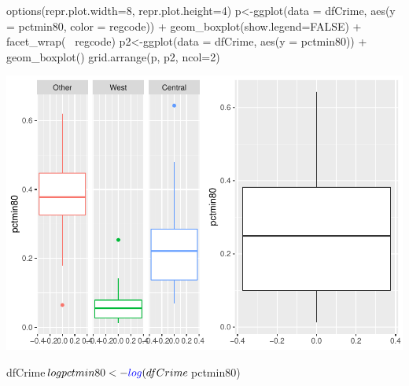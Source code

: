 \documentclass[]{article}
\newenvironment{Shaded}{}{}
\newcommand{\DataTypeTok}[1]{#1}
\newcommand{\DecValTok}[1]{#1}
\newcommand{\KeywordTok}[1]{\textcolor[rgb]{0.00,0.00,1.00}{#1}}
\newcommand{\NormalTok}[1]{#1}
\newcommand{\OperatorTok}[1]{#1}
\newcommand{\OtherTok}[1]{\textcolor[rgb]{1.00,0.25,0.00}{#1}}
\newcommand{\StringTok}[1]{\textcolor[rgb]{0.00,0.50,0.50}{#1}}
\begin{document}
\begin{Shaded}
\begin{Highlighting}[]
\KeywordTok{options}\NormalTok{(}\DataTypeTok{repr.plot.width=}\DecValTok{8}\NormalTok{, }\DataTypeTok{repr.plot.height=}\DecValTok{4}\NormalTok{)}
\NormalTok{p<-}\KeywordTok{ggplot}\NormalTok{(}\DataTypeTok{data =}\NormalTok{ dfCrime, }\KeywordTok{aes}\NormalTok{(}\DataTypeTok{y =}\NormalTok{ pctmin80, }\DataTypeTok{color =}\NormalTok{ regcode)) }\OperatorTok{+}
\StringTok{     }\KeywordTok{geom_boxplot}\NormalTok{(}\DataTypeTok{show.legend=}\OtherTok{FALSE}\NormalTok{) }\OperatorTok{+}\StringTok{ }\KeywordTok{facet_wrap}\NormalTok{(}\OperatorTok{~}\StringTok{ }\NormalTok{regcode)}
\NormalTok{p2<-}\KeywordTok{ggplot}\NormalTok{(}\DataTypeTok{data =}\NormalTok{ dfCrime, }\KeywordTok{aes}\NormalTok{(}\DataTypeTok{y =}\NormalTok{ pctmin80)) }\OperatorTok{+}
\StringTok{     }\KeywordTok{geom_boxplot}\NormalTok{()}
\KeywordTok{grid.arrange}\NormalTok{(p, p2, }\DataTypeTok{ncol=}\DecValTok{2}\NormalTok{)}
\end{Highlighting}
\end{Shaded}

\includegraphics{Bagnard_Gaustad_Hartman_Leung_Lab_3_files/figure-latex/unnamed-chunk-77-1.pdf}

\begin{Shaded}
\begin{Highlighting}[]
\NormalTok{dfCrime}\OperatorTok{$}\NormalTok{logpctmin80 <-}\StringTok{ }\KeywordTok{log}\NormalTok{(dfCrime}\OperatorTok{$}\NormalTok{pctmin80)}
\end{Highlighting}
\end{Shaded}
\end{document}

